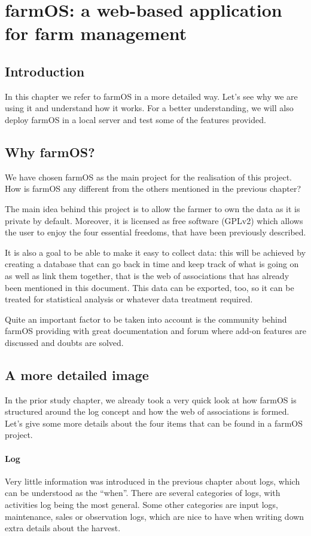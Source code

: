 \chapter{farmOS: a web-based application for farm management}\label{cap:diseño}

\section{Introduction}
In this chapter we refer to farmOS in a more detailed way. Let's see why we are using it and understand how it works. For a better understanding, we will also deploy farmOS in a local server and test some of the features provided.  

\section{Why farmOS?}
We have chosen farmOS as the main project for the realisation of this project. How is farmOS any different from the others mentioned in the previous chapter? 

The main idea behind this project is to allow the farmer to own the data as it is private by default. Moreover, it is licensed as free software\cite{fsf-faq-license} (GPLv2) which allows the user to enjoy the four essential freedoms, that have been previously described.

It is also a goal to be able to make it easy to collect data: this will be achieved by creating a database that can go back in time and keep track of what is going on as well as link them together, that is the web of associations that has already been mentioned in this document. This data can be exported, too, so it can be treated for statistical analysis or whatever data treatment required.

Quite an important factor to be taken into account is the community\cite{farmos-community} behind farmOS providing with great documentation and forum where add-on features are discussed and doubts are solved.

\section{A more detailed image}
In the prior study chapter, we already took a very quick look at how farmOS is structured around the log concept and how the web of associations is formed. Let's give some more details about the four items that can be found in a farmOS project.

\subsubsection{Log}
Very little information was introduced in the previous chapter about logs, which can be understood as the ``when''. There are several categories of logs, with activities log being the most general. Some other categories are input logs, maintenance, sales or observation logs, which are nice to have when writing down extra details about the harvest.

